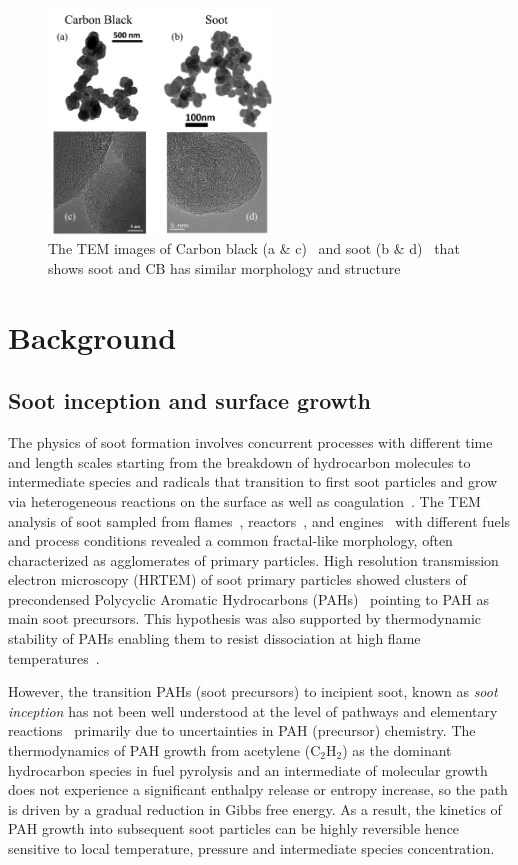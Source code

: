 \begin{figure}[!htbp]
	\centering
	\includegraphics[height=60mm, ]{Figures/Introduction/soot_CB_HRTEM.jpg}
	\caption{The TEM images of Carbon black (a \& c)~\citep{singh2018nanostructure} and soot (b \& d)~\citep{vander2007hrtem, lapuerta2017morphological}
	\label{fig:sootCBHRTEM} that shows soot and CB has similar morphology and structure}
\end{figure} 



\section{Background}
\subsection{Soot inception and surface growth}
The physics of soot formation involves concurrent processes with different time and length scales starting from the breakdown of hydrocarbon molecules to intermediate species and radicals that transition to first soot particles and grow via heterogeneous reactions on the surface as well as coagulation~\citep{d2009combustion}. The TEM analysis of soot sampled from flames~\citep{lapuerta2017morphological}, reactors~\citep{ono2017experimental}, and engines~\citep{wei2020morphology} with different fuels and process conditions revealed a common fractal-like morphology, often characterized as agglomerates of primary particles. High resolution transmission electron microscopy (HRTEM) of soot primary particles showed clusters of precondensed Polycyclic Aromatic Hydrocarbons (PAHs)~\cite{alfe2009structure} pointing to PAH as main soot precursors. This hypothesis was also supported by thermodynamic stability of PAHs enabling them to resist dissociation at high flame temperatures~\cite{stein1985high}. 

However, the transition PAHs (soot precursors) to incipient soot, known as \textit{soot inception} has not been well understood at the level of pathways and elementary reactions~\cite{Wang2011} primarily due to uncertainties in PAH (precursor) chemistry. The thermodynamics of PAH growth from acetylene ($\mathrm{C_2H_2}$) as the dominant hydrocarbon species in fuel pyrolysis and an
intermediate of molecular growth does not experience a significant enthalpy release or entropy increase, so the path is driven by a gradual reduction in Gibbs free energy. As a result, the kinetics of PAH growth into 
subsequent soot particles can be highly reversible hence sensitive to local temperature, pressure and intermediate species concentration.

